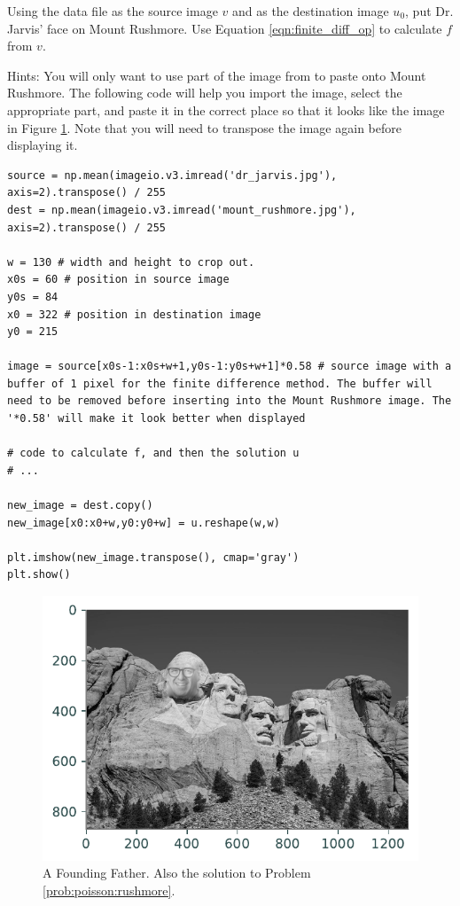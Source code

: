 \begin{problem}
Using the data file  as the source image $v$ and  as the destination image $u_0$, put Dr. Jarvis' face on Mount Rushmore. Use Equation \eqref{eqn:finite_diff_op} to calculate $f$ from $v$.

Hints: You will only want to use part of the image from  to paste onto Mount Rushmore. The following code will help you import the image, select the appropriate part, and paste it in the correct place so that it looks like the image in Figure \ref{poisson:mt_rushmore}. Note that you will need to transpose the image again before displaying it.

\begin{lstlisting}
source = np.mean(imageio.v3.imread('dr_jarvis.jpg'), axis=2).transpose() / 255
dest = np.mean(imageio.v3.imread('mount_rushmore.jpg'), axis=2).transpose() / 255

w = 130 # width and height to crop out.
x0s = 60 # position in source image
y0s = 84
x0 = 322 # position in destination image
y0 = 215

image = source[x0s-1:x0s+w+1,y0s-1:y0s+w+1]*0.58 # source image with a buffer of 1 pixel for the finite difference method. The buffer will need to be removed before inserting into the Mount Rushmore image. The '*0.58' will make it look better when displayed

# code to calculate f, and then the solution u
# ...

new_image = dest.copy()
new_image[x0:x0+w,y0:y0+w] = u.reshape(w,w)

plt.imshow(new_image.transpose(), cmap='gray')
plt.show()

\end{lstlisting}
\label{prob:poisson:rushmore}
\end{problem}

\begin{figure}[H]
\includegraphics[scale=0.7]{figures/mt_rushmore.pdf}
\caption{A Founding Father. Also the solution to Problem \ref{prob:poisson:rushmore}.}
\label{poisson:mt_rushmore}
\end{figure}
